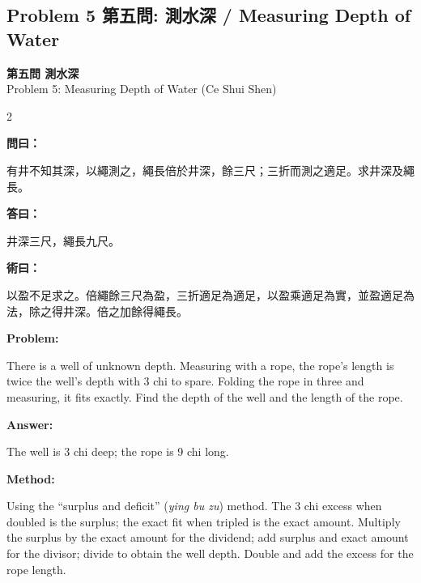 \documentclass[11pt,a4paper]{article}
\newcommand{\wen}{\textbf{\color{sectioncolor}問}}
\newcommand{\da}{\textbf{\color{answercolor}答}}
\newcommand{\shu}{\textbf{\color{methodcolor}術}}
\newcommand{\prob}{\textbf{\color{sectioncolor}Problem}}
\newcommand{\ans}{\textbf{\color{answercolor}Answer}}
\newcommand{\meth}{\textbf{\color{methodcolor}Method}}
\newcommand{\probheader}[2]{%
  \begin{center}
  \colorbox{problembg}{\parbox{\dimexpr\linewidth-4pt}{%
    \centering\smallskip
    {\large\bfseries\color{sectioncolor}#1}\\[0.3em]
    {\normalsize\color{subsectioncolor}#2}%
    \smallskip
  }}
  \end{center}
  \vspace{0.5em}
}
\newenvironment{zhanswer}{%
  \medskip\noindent{\color{answercolor}\rule{0.9\columnwidth}{0.4pt}}%
  \par\color{answercolor}\small
}{\par\medskip}
\newenvironment{enanswer}{%
  \medskip\noindent{\color{answercolor}\rule{0.9\columnwidth}{0.4pt}}%
  \par\color{answercolor}\small
}{\par\medskip}
\newenvironment{zhmethod}{%
  \medskip\noindent{\color{methodcolor}\rule{0.9\columnwidth}{0.4pt}}%
  \par\color{methodcolor}\small
}{\par\medskip}
\newenvironment{enmethod}{%
  \medskip\noindent{\color{methodcolor}\rule{0.9\columnwidth}{0.4pt}}%
  \par\color{methodcolor}\small
}{\par\medskip}
\begin{document}
\vspace{0.5em}

\subsection*{Problem 5 第五問: 測水深 / Measuring Depth of Water}

\probheader{第五問 測水深}{Problem 5: Measuring Depth of Water (Ce Shui Shen)}

\begin{paracol}{2}

\switchcolumn[0]
\noindent\wen\textbf{曰：}

有井不知其深，以繩測之，繩長倍於井深，餘三尺；三折而測之適足。求井深及繩長。

\begin{zhanswer}
\noindent\da\textbf{曰：}

井深三尺，繩長九尺。
\end{zhanswer}

\begin{zhmethod}
\noindent\shu\textbf{曰：}

以盈不足求之。倍繩餘三尺為盈，三折適足為適足，以盈乘適足為實，並盈適足為法，除之得井深。倍之加餘得繩長。
\end{zhmethod}

\switchcolumn[1]
\noindent\prob\textbf{:}

There is a well of unknown depth. Measuring with a rope, the rope's length is twice the well's depth with 3 chi to spare. Folding the rope in three and measuring, it fits exactly. Find the depth of the well and the length of the rope.
\begin{enanswer}
\noindent\ans\textbf{:}

The well is 3 chi deep; the rope is 9 chi long.
\end{enanswer}

\begin{enmethod}
\noindent\meth\textbf{:}

Using the ``surplus and deficit'' (\textit{ying bu zu}) method. The 3 chi excess when doubled is the surplus; the exact fit when tripled is the exact amount. Multiply the surplus by the exact amount for the dividend; add surplus and exact amount for the divisor; divide to obtain the well depth. Double and add the excess for the rope length.
\end{enmethod}

\end{paracol}
\end{document}

